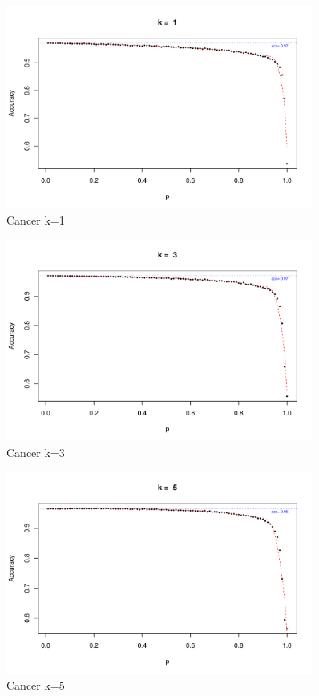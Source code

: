\documentclass{article}
\begin{document}
\begin{figure}[h!]
 \centering
 \includegraphics[width=0.9\textwidth]{./figures/Cancer_k1.pdf}
 \caption{Cancer k=1}
 \label{fig:Cancer1}
\end{figure}
\begin{figure}[h!]
 \centering
 \includegraphics[width=0.9\textwidth]{./figures/Cancer_k3.pdf}
 \caption{Cancer k=3}
 \label{fig:Cancer3}
\end{figure}
\begin{figure}
 \centering
 \includegraphics[width=0.9\textwidth]{./figures/Cancer_k5.pdf}
 \caption{Cancer k=5}
 \label{fig:Cancer5}
\end{figure}
\end{document}

